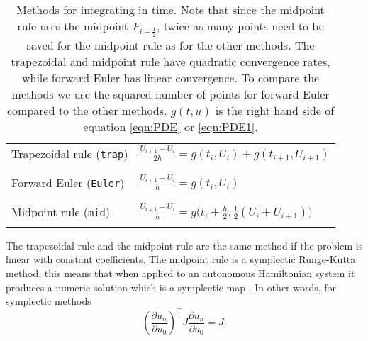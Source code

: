 \begin{table}

\caption{Methods for integrating in time. Note that since the midpoint rule uses the midpoint $F_{i+\frac{1}{2}}$, twice as many points need to be saved for the midpoint rule as for the other methods. The trapezoidal and midpoint rule have quadratic convergence rates, while forward Euler has linear convergence. To compare the methods we use the squared number of points for forward Euler compared to the other methods. $g(t,u)$ is the right hand side of equation \eqref{eqn:PDE} or \eqref{eqn:PDE1}.}
\centering
\begin{tabular}{l l}
	Trapezoidal rule (\texttt{trap}) \cite{trapezoidal} & $ \frac{U_{i+1} - U_{i}}{2h} =  g(t_i,U_i) + g(t_{i+1},U_{i+1}) $ \\
	\\
\hline	
\\
	Forward Euler (\texttt{Euler}) \cite{forwardeuler} & $ \frac{U_{i+1} - U_{i}}{h} = g ( t_i, U_i ) $ \\ %
	\\
	\hline
	\\
	Midpoint rule (\texttt{mid}) \cite{midpoint} & $ \frac{U_{i+1} - U_{i}}{h} =  g \Big(  t_{i}+\frac{h}{2} , \frac{1}{2}(U_i + U_{i+1})    \Big) $ \\%
	\\
    
    
\end{tabular}


\label{tab:intmet}
\end{table}
\noindent The trapezoidal rule and the midpoint rule are the same method if the problem is linear with constant coefficients. The midpoint rule is a symplectic Runge-Kutta method, this means that when applied to an autonomous Hamiltonian system it produces a numeric solution which is a symplectic map \cite{symplecticintegrator}. In other words, for symplectic methods
\begin{equation}
\left( \frac{\partial u_n}{\partial u_0 }  \right)^\top J  \frac{\partial u_n}{\partial u_0 } = J.
\end{equation}
